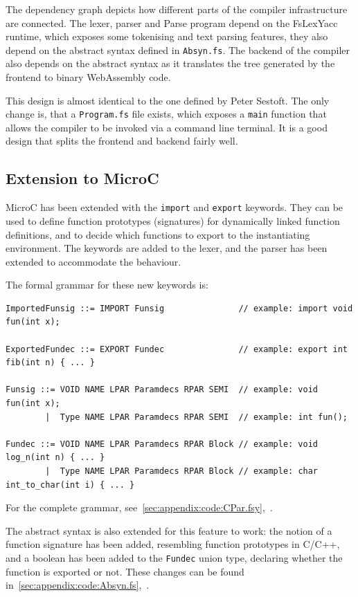 \documentclass[a4paper]{article}
\begin{document}
The dependency graph depicts how different parts of the compiler infrastructure are connected. The lexer, parser and Parse program depend on the FsLexYacc runtime, which exposes some tokenising and text parsing features, they also depend on the abstract syntax defined in \texttt{Absyn.fs}. The backend of the compiler also depends on the abstract syntax as it translates the tree generated by the frontend to binary WebAssembly code.

This design is almost identical to the one defined by Peter Sestoft. The only change is, that a \texttt{Program.fs} file exists, which exposes a \texttt{main} function that allows the compiler to be invoked via a command line terminal. It is a good design that splits the frontend and backend fairly well.

\subsection{Extension to MicroC}
\label{sec:technical:extension}
MicroC has been extended with the \texttt{import} and \texttt{export} keywords. They can be used to define function prototypes (signatures) for dynamically linked function definitions, and to decide which functions to export to the instantiating environment. The keywords are added to the lexer, and the parser has been extended to accommodate the behaviour.

The formal grammar for these new keywords is:
\begin{verbatim}
ImportedFunsig ::= IMPORT Funsig               // example: import void fun(int x);

ExportedFundec ::= EXPORT Fundec               // example: export int fib(int n) { ... }

Funsig ::= VOID NAME LPAR Paramdecs RPAR SEMI  // example: void fun(int x);
        |  Type NAME LPAR Paramdecs RPAR SEMI  // example: int fun();
        
Fundec ::= VOID NAME LPAR Paramdecs RPAR Block // example: void log_n(int n) { ... }
        |  Type NAME LPAR Paramdecs RPAR Block // example: char int_to_char(int i) { ... }
\end{verbatim}

For the complete grammar, see~\ref{sec:appendix:code:CPar.fsy},~.

The abstract syntax is also extended for this feature to work: the notion of a function signature has been added, resembling function prototypes in C/C++, and a boolean has been added to the \texttt{Fundec} union type, declaring whether the function is exported or not. These changes can be found in~\ref{sec:appendix:code:Absyn.fs},~.
\end{document}
